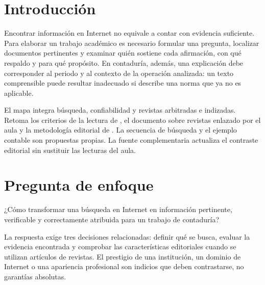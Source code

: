 


\section{Introducción}
Encontrar información en Internet no equivale a contar con evidencia suficiente. Para elaborar un trabajo académico es necesario formular una pregunta, localizar documentos pertinentes y examinar quién sostiene cada afirmación, con qué respaldo y para qué propósito. En contaduría, además, una explicación debe corresponder al periodo y al contexto de la operación analizada: un texto comprensible puede resultar inadecuado si describe una norma que ya no es aplicable.

El mapa integra búsqueda, confiabilidad y revistas arbitradas e indizadas. Retoma los criterios de la lectura de \textcite{castillo2020}, el documento sobre revistas enlazado por el aula \parencite{revistasaula} y la metodología editorial de \textcite{latindex2025}. La secuencia de búsqueda y el ejemplo contable son propuestas propias. La fuente complementaria actualiza el contraste editorial sin sustituir las lecturas del aula.

\section{Pregunta de enfoque}
¿Cómo transformar una búsqueda en Internet en información pertinente, verificable y correctamente atribuida para un trabajo de contaduría?

La respuesta exige tres decisiones relacionadas: definir qué se busca, evaluar la evidencia encontrada y comprobar las características editoriales cuando se utilizan artículos de revistas. El prestigio de una institución, un dominio de Internet o una apariencia profesional son indicios que deben contrastarse, no garantías absolutas.

